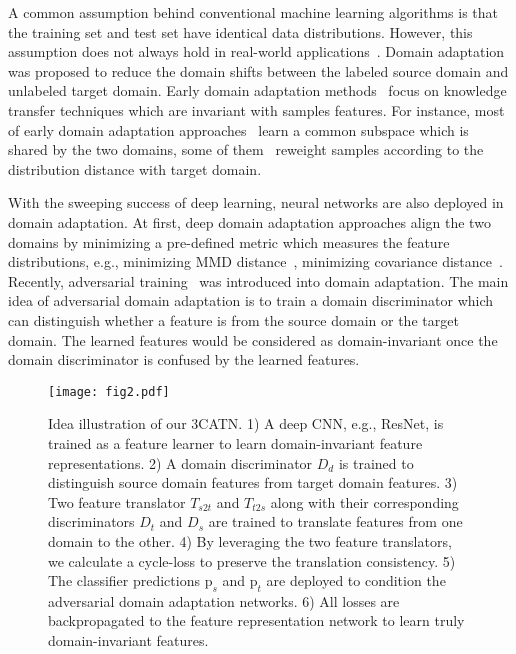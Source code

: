 \documentclass[sigconf]{acmart}
\begin{document}
A common assumption behind conventional machine learning algorithms is that the training set and test set have identical data distributions. However, this assumption does not always hold in real-world applications~\cite{pan2010survey,visda2017}. Domain adaptation~\cite{pinheiro2018unsupervised,taigman2016unsupervised} was proposed to reduce the domain shifts between the labeled source domain and unlabeled target domain. Early domain adaptation methods~\cite{pan2011domain,gong2012geodesic,aljundi2015landmarks} focus on knowledge transfer techniques which are invariant with samples features. For instance, most of early domain adaptation approaches~\cite{pan2011domain,gong2012geodesic,ding2014latent} learn a common subspace which is shared by the two domains, some of them~\cite{aljundi2015landmarks,hubert2016learning} reweight samples according to the distribution distance with target domain.

With the sweeping success of deep learning, neural networks are also deployed in domain adaptation. At first, deep domain adaptation approaches align the two domains by minimizing a pre-defined metric which measures the feature distributions, e.g., minimizing MMD distance~\cite{long2017deep}, minimizing covariance distance~\cite{sun2016deep}. Recently, adversarial training~\cite{tzeng2017adversarial,ganin2016domain,long2018conditional} was introduced into domain adaptation. The main idea of adversarial domain adaptation is to train a domain discriminator which can distinguish whether a feature is from the source domain or the target domain. The learned features would be considered as domain-invariant once the domain discriminator is confused by the learned features. 

\begin{figure*}[t]
\begin{center}
\texttt{[image: fig2.pdf]}
\end{center}
\vspace{-10pt}
\caption{Idea illustration of our 3CATN. 1) A deep CNN, e.g., ResNet, is trained as a feature learner to learn domain-invariant feature representations. 2) A domain discriminator $D_d$ is trained to distinguish source domain features from target domain features. 3) Two feature translator $T_{s2t}$ and $T_{t2s}$ along with their corresponding discriminators $D_t$ and $D_s$ are trained to translate features from one domain to the other. 4) By leveraging the two feature translators, we calculate a cycle-loss to preserve the translation consistency. 5) The classifier predictions $\mathrm{p}_s$ and $\mathrm{p}_t$ are deployed to condition the adversarial domain adaptation networks. 6) All losses are backpropagated to the feature representation network to learn truly domain-invariant features.}
\label{fig:ideaill}
\end{figure*}  
\end{document}

